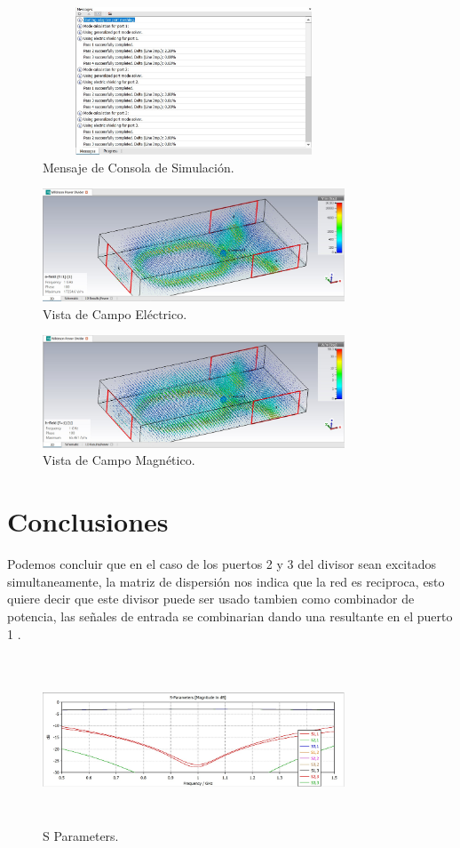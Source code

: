 \documentclass[a4paper]{IEEEtran} %
\begin{document}
\begin{figure}[h]    
    \centering
    \includegraphics[width=9cm,height=4.4cm]{imagenes/img13}
    \caption{Mensaje de Consola de Simulación.}
    \label{fig:modelamiento8}
\end{figure}
\vspace{10mm}
\begin{figure}[h]    
    \centering
    \includegraphics[width=9cm]{imagenes/img15}
    \caption{Vista de Campo Eléctrico.}
    \label{fig:modelamiento9}
\end{figure}
\begin{figure}[h]    
    \centering
    \includegraphics[width=9cm]{imagenes/img16}
    \caption{Vista de Campo Magnético.}
    \label{fig:modelamiento10}
\end{figure}
\section{Conclusiones}
Podemos concluir que en el caso de los puertos 2 y 3 del divisor sean excitados simultaneamente, la matriz de dispersión nos indica que la red es reciproca, esto quiere decir que este divisor puede ser usado tambien como combinador de potencia, las señales de entrada se combinarian dando una resultante en el puerto 1 \cite{wilkinson1960n}.

\begin{figure}[h]    
    \centering
    \includegraphics[width=9cm,height=5cm]{imagenes/img18}
    \caption{S Parameters.}
    \label{fig:parametro_s}
\end{figure}
\end{document}
